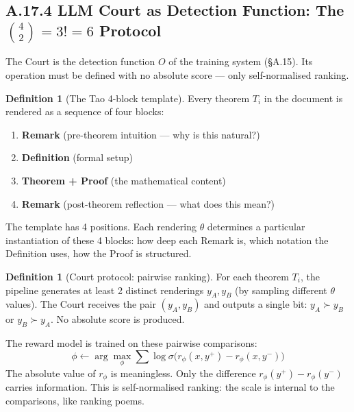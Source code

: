 \documentclass[11pt,a4paper]{article}
\theoremstyle{definition}
\newtheorem{definition}[theorem]{Definition}
\theoremstyle{remark}
\begin{document}
\subsection{A.17.4 LLM Court as Detection Function: The $\binom{4}{2} = 3! = 6$ Protocol}

The Court is the detection function $O$ of the training system (\S A.15). Its operation must be defined with no absolute score --- only self-normalised ranking.

\begin{definition}[The Tao 4-block template]\label{def:tao_template}
Every theorem $T_i$ in the document is rendered as a sequence of four blocks:
\begin{enumerate}[nosep]
  \item[\textbf{R\textsuperscript{-}}:] \textbf{Remark} (pre-theorem intuition --- why is this natural?)
  \item[\textbf{D}:] \textbf{Definition} (formal setup)
  \item[\textbf{T}:] \textbf{Theorem + Proof} (the mathematical content)
  \item[\textbf{R\textsuperscript{+}}:] \textbf{Remark} (post-theorem reflection --- what does this mean?)
\end{enumerate}
The template has 4 positions. Each rendering $\theta$ determines a particular instantiation of these 4 blocks: how deep each Remark is, which notation the Definition uses, how the Proof is structured.
\end{definition}

\begin{definition}[Court protocol: pairwise ranking]\label{def:court_protocol}
For each theorem $T_i$, the pipeline generates at least 2 distinct renderings $y_A, y_B$ (by sampling different $\theta$ values). The Court receives the pair $(y_A, y_B)$ and outputs a single bit: $y_A \succ y_B$ or $y_B \succ y_A$. No absolute score is produced.

The reward model is trained on these pairwise comparisons:
\[
  \phi \leftarrow \arg\max_\phi \sum \log \sigma\bigl(r_\phi(x, y^+) - r_\phi(x, y^-)\bigr)
\]
The absolute value of $r_\phi$ is meaningless. Only the difference $r_\phi(y^+) - r_\phi(y^-)$ carries information. This is self-normalised ranking: the scale is internal to the comparisons, like ranking poems.
\end{definition}
\end{document}
